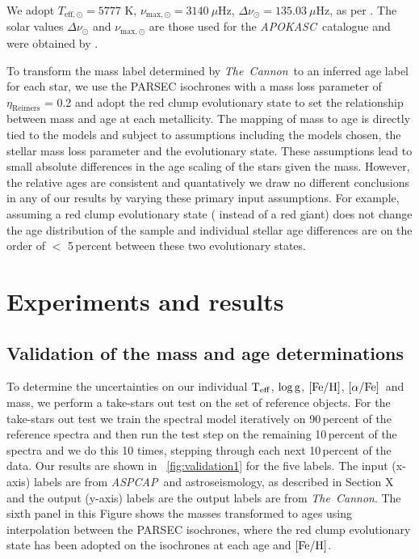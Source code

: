 \documentclass[12pt, preprint]{aastex}
\newcommand{\project}[1]{\textsl{#1}}
\newcommand{\tc}{\project{The~Cannon}}
\newcommand{\apokasc}{\project{APOKASC}}
\newcommand{\aspcap}{\project{ASPCAP}}
\newcommand{\teff}{\mbox{$\rm T_{eff}$}}
\newcommand{\feh}{\mbox{$\rm [Fe/H]$}}
\newcommand{\alphafe}{\mbox{$\rm [\alpha/Fe]$}}
\newcommand{\logg}{\mbox{$\rm \log g$}}
\begin{document}
We adopt  $T_{\mathrm{eff,\odot}}=5777$ K, $\nu_{\mathrm{max,\odot}}=3140\ \mu$Hz, $\Delta \nu_{\odot}=135.03\ \mu$Hz, as per \citet{Martig2014}. The solar values  $\Delta \nu_{\odot}$ and $\nu_{\mathrm{max,\odot}}$ are those used for the \apokasc\ catalogue and were obtained by \cite{Hekker2013}.

To transform the mass label determined by \tc\ to an inferred age label for each star, we use the PARSEC isochrones \citep{Bressan2012} with a mass loss parameter of $\eta_{\mbox{Reimers}}$ = 0.2 and adopt the red clump evolutionary state to set the relationship between mass and age at each metallicity.  The mapping of mass to age is directly tied to the models and subject to assumptions including the models chosen, the stellar mass loss parameter and the evolutionary state. These assumptions lead to small absolute differences in the age scaling of the stars given the mass. However,  the relative ages are consistent and quantatively we draw no different conclusions in any of our results by varying these primary input assumptions. For example, assuming a red clump evolutionary state ( instead of a red giant) does not change the age distribution of the sample and individual stellar age differences are on the order of $<$ 5\,percent between these two evolutionary states. 

\section{Experiments and results}

\subsection{Validation of the mass and age determinations}

To determine the uncertainties on our individual \teff, \logg, \feh, \alphafe\ and mass, we perform a take-stars out test on the set of reference objects.
For the take-stars out test we train the spectral model iteratively on 90\,percent of the reference spectra and then run the test step on the remaining 10\,percent of the spectra and we do this 10 times, stepping through each next 10\,percent of the data. Our results are shown in \figurename~\ref{fig:validation1} for the five labels. The input (x-axis) labels are from \aspcap\ and astroseismology, as described in Section X and the output (y-axis) labels are the output labels are from \tc.  The sixth panel in this Figure shows the masses transformed to ages using interpolation between the PARSEC isochrones, where the red clump evolutionary state has been adopted on the isochrones at each age and \feh. 
\end{document}
